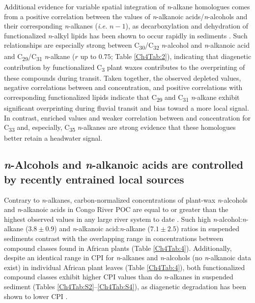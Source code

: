 Additional evidence for variable spatial integration of \textit{n}-alkane homologues comes from a positive correlation between the  values of \textit{n}-alkanoic acids/\textit{n}-alcohols and their corresponding \textit{n}-alkanes (\textit{i.e.} $n - 1$), as decarboxylation and dehydration of functionalized \textit{n}-alkyl lipids has been shown to occur rapidly in sediments \citep{Cranwell:1981vg,Sun:1994wj,Sun:1997wr,Hoefs:2002wu}. Such relationships are especially strong between C\textsubscript{30}/C\textsubscript{32} \textit{n}-alcohol and \textit{n}-alkanoic acid and C\textsubscript{29}/C\textsubscript{31} \textit{n}-alkane ($r$ up to $0.75$; Table \ref{Ch4Tab:2}), indicating that diagenetic contribution by functionalized C\textsubscript{3} plant waxes contributes to the overprinting of these compounds during transit. Taken together, the observed depleted  values, negative correlations between  and concentration, and positive  correlations with corresponding functionalized lipids indicate that C\textsubscript{29} and C\textsubscript{31} \textit{n}-alkane exhibit significant overprinting during fluvial transit and bias toward a more local signal. In contrast, enriched  values and weaker correlation between  and concentration for C\textsubscript{33} and, especially, C\textsubscript{35} \textit{n}-alkanes are strong evidence that these homologues better retain a headwater signal.

\subsection{\textit{n}-Alcohols and \textit{n}-alkanoic acids are controlled by recently entrained local sources}\label{Ch4Sec:52}

Contrary to \textit{n}-alkanes, carbon-normalized concentrations of plant-wax \textit{n}-alcohols and \textit{n}-alkanoic acids in Congo River POC are equal to or greater than the highest observed values in any large river system to date \citep{Saliot:2001un,vanDongen:2008kj,Galy:2011ix,Tao:2015bq}. Such high \textit{n}-alcohol:\textit{n}-alkane ($3.8 \pm 0.9$) and \textit{n}-alkanoic acid:\textit{n}-alkane ($7.1 \pm 2.5$) ratios in suspended sediments contrast with the overlapping range in concentrations between compound classes found in African plants (Table \ref{Ch4Tab:4}). Additionally, despite an identical range in CPI for \textit{n}-alkanes and \textit{n}-alcohols (no \textit{n}-alkanoic data exist) in individual African plant leaves (Table  \ref{Ch4Tab:4}), both functionalized compound classes exhibit higher CPI values than do \textit{n}-alkanes in suspended sediment (Tables \ref{Ch4Tab:S2}--\ref{Ch4Tab:S4}), as diagenetic degradation has been shown to lower CPI \citep{Meyers:1993vwa}.

